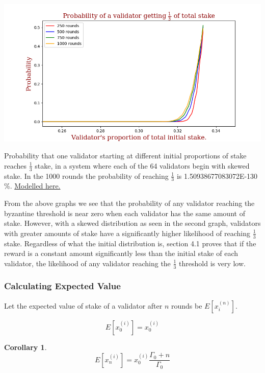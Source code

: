 \documentclass{article}
\newtheorem{corollary}{Corollary}[theorem]
\renewcommand{\|}{\;|\;}
\begin{document}
\begin{center}
\includegraphics[scale=0.6]{images/Cons_reward_probability_non_log.png}\newline\caption{Probability that one validator starting at different initial proportions of stake reaches $\frac{1}{3}$ stake, in a system where each of the 64 validators begin with skewed stake. In the 1000 rounds the probability of reaching $\frac{1}{3}$ is 1.50938677083072E-130 \%. \href{https://github.com/aparnakr/pos-analysis}{Modelled here.}}
\end{center}
From the above graphs we see that the probability of any validator reaching the byzantine threshold is near zero when each validator has the same amount of stake. However, with a skewed distribution as seen in the second graph, validators with greater amounts of stake have a significantly higher likelihood of reaching $\frac{1}{3}$ stake.
\newline \newline 
Regardless of what the initial distribution is, section 4.1 proves that if the reward is a constant amount significantly less than the initial stake of each validator, the likelihood of any validator reaching the $\frac{1}{3}$ threshold is very low. 



\subsubsection{Calculating Expected Value}
Let the expected value of stake of a validator after $n$ rounds be $E[x_i^{(n)}]$.

$$E[x_0^{(i)}]= x_0^{(i)}$$

\begin{corollary} $$E[x_n^{(i)}] = x_0^{(i)}\frac{\Gamma_0 + n}{\Gamma_0}$$
\end{corollary}
\end{document}
